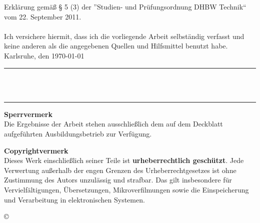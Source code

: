Erklärung gemäß § 5 (3) der ”Studien- und Prüfungsordnung DHBW Technik“ vom 22. September 2011.\\
\\
Ich versichere hiermit, dass ich die vorliegende Arbeit selbständig verfasst und keine anderen als die angegebenen Quellen und Hilfsmittel benutzt habe.\\

Karlsruhe, den \today \\[4ex]


\rule[-0.2cm]{5cm}{0.5pt} \\

\textsc{\autor} \\[10ex]

\hrule 
\vspace*{1.0cm}
\noindent \textbf{\Large{Sperrvermerk}}\\
\normalsize
Die Ergebnisse der Arbeit stehen ausschließlich dem auf dem Deckblatt aufgeführten Ausbildungsbetrieb zur Verfügung.

\vspace*{1.0cm}
\noindent \textbf{\Large{Copyrightvermerk}}\\
\normalsize
Dieses Werk einschließlich seiner Teile ist \textbf{urheberrechtlich geschützt}. Jede Verwertung außerhalb der engen Grenzen des Urheberrechtgesetzes ist ohne Zustimmung des Autors unzulässig und strafbar. Das gilt insbesondere für Vervielfältigungen, Übersetzungen, Mikroverfilmungen sowie die Einspeicherung und Verarbeitung in elektronischen Systemen.
\begin{flushright}
\copyright{} \jahr
\end{flushright}